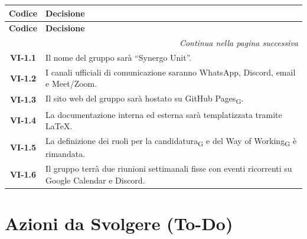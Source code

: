 \vspace{-0.3cm}
\noindent
\begin{longtable}{c p{12cm}}
    \toprule
    \textbf{Codice} & \textbf{Decisione} \\
    \midrule
    \endfirsthead

    \toprule
    \textbf{Codice} & \textbf{Decisione} \\
    \midrule
    \endhead

    \midrule
    \multicolumn{2}{r}{\textit{Continua nella pagina successiva}} \\
    \midrule
    \endfoot

    \bottomrule
    \endlastfoot

    \textbf{VI-1.1} & Il nome del gruppo sarà “Synergo Unit”. \\
    \textbf{VI-1.2} & I canali ufficiali di comunicazione saranno WhatsApp, Discord, email e Meet/Zoom. \\
    \textbf{VI-1.3} & Il sito web del gruppo sarà hostato su GitHub Pages\textsubscript{G}. \\
    \textbf{VI-1.4} & La documentazione interna ed esterna sarà templatizzata tramite LaTeX. \\
    \textbf{VI-1.5} & La definizione dei ruoli per la candidatura\textsubscript{G} e del Way of Working\textsubscript{G} è rimandata. \\
    \textbf{VI-1.6} & Il gruppo terrà due riunioni settimanali fisse con eventi ricorrenti su Google Calendar e Discord. \\
\end{longtable}

\section{Azioni da Svolgere (To-Do)}

\renewcommand{\arraystretch}{1.3}

